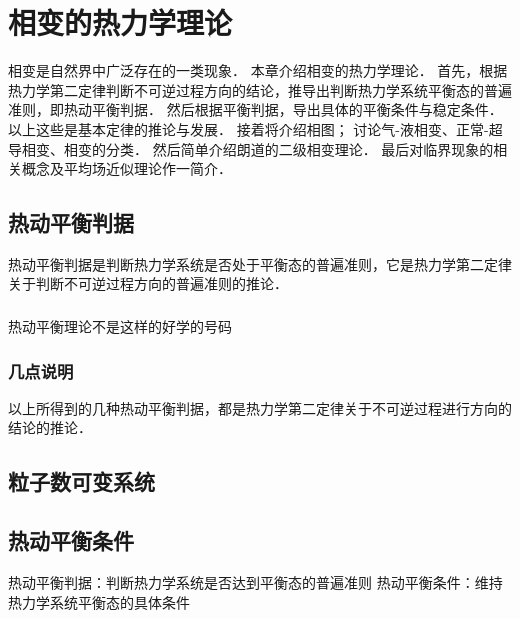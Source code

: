 \section{相变的热力学理论}
相变是自然界中广泛存在的一类现象．
本章介绍相变的热力学理论．
首先，根据热力学第二定律判断不可逆过程方向的结论，推导出判断热力学系统平衡态的普遍准则，即热动平衡判据．
然后根据平衡判据，导出具体的平衡条件与稳定条件．以上这些是基本定律的推论与发展．
接着将介绍相图；
讨论气-液相变、正常-超导相变、相变的分类．
然后简单介绍朗道的二级相变理论．
最后对临界现象的相关概念及平均场近似理论作一简介．

\subsection{热动平衡判据}
热动平衡判据是判断热力学系统是否处于平衡态的普遍准则，它是热力学第二定律关于判断不可逆过程方向的普遍准则的推论．
\subsubsection{}
热动平衡理论不是这样的好学的号码








\subsubsection{}







\subsubsection{几点说明}

以上所得到的几种热动平衡判据，都是热力学第二定律关于不可逆过程进行方向的结论的推论．




\subsection{粒子数可变系统}


\subsection{热动平衡条件}
热动平衡判据：判断热力学系统是否达到平衡态的普遍准则
热动平衡条件：维持热力学系统平衡态的具体条件

